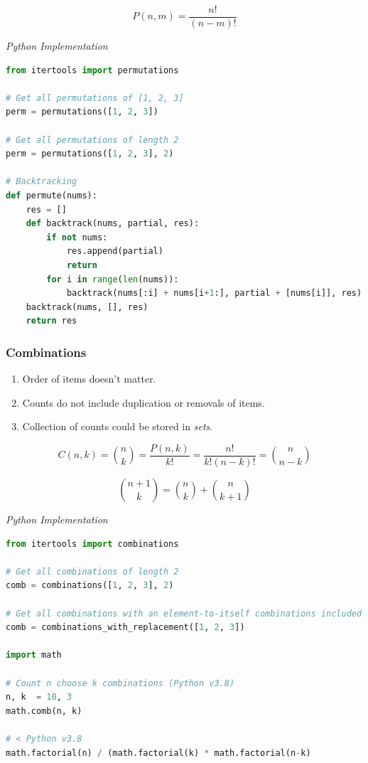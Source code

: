 \documentclass{article}
\begin{document}
    \[
    P(n,m) = \frac{n!}{(n-m)!}
    \]

    
\vspace{8pt} \emph{Python Implementation}
\begin{lstlisting}[language=Python]
from itertools import permutations 

# Get all permutations of [1, 2, 3] 
perm = permutations([1, 2, 3])   

# Get all permutations of length 2 
perm = permutations([1, 2, 3], 2)

# Backtracking
def permute(nums):
    res = []
    def backtrack(nums, partial, res):
        if not nums:
            res.append(partial)
            return 
        for i in range(len(nums)):
            backtrack(nums[:i] + nums[i+1:], partial + [nums[i]], res)
    backtrack(nums, [], res)
    return res
\end{lstlisting} 

    \subsubsection{Combinations}
    \begin{enumerate}
        \item Order of items doesn't matter. 
        \item Counts do not include duplication or removals of items.
        \item Collection of counts could be stored in \emph{sets}.
    \end{enumerate}
    
    \[
       C(n, k) = \binom{n}{k} = \frac{P(n,k)}{k!} = \frac{n!}{k!(n-k)!} = \binom{n}{n-k}
    \]
    
    \[
        \binom{n+1}{k} = \binom{n}{k} + \binom{n}{k+1}
    \]

\vspace{8pt} \emph{Python Implementation}
\begin{lstlisting}[language=Python]
from itertools import combinations 

# Get all combinations of length 2 
comb = combinations([1, 2, 3], 2)

# Get all combinations with an element-to-itself combinations included 
comb = combinations_with_replacement([1, 2, 3])

import math

# Count n choose k combinations (Python v3.8)
n, k  = 10, 3
math.comb(n, k)

# < Python v3.8
math.factorial(n) / (math.factorial(k) * math.factorial(n-k)

\end{lstlisting}
\end{document}
